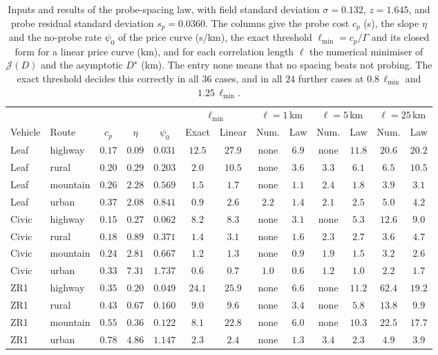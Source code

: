 \begin{table}[htbp]
\centering\small
\setlength{\tabcolsep}{3pt}
\caption{Inputs and results of the probe-spacing law, with field standard deviation $\sigma=0.132$, $z=1.645$, and probe residual standard deviation $s_p=0.0360$. The columns give the probe cost $c_p$ (s), the slope $\eta$ and the no-probe rate $\psi_0$ of the price curve (s/km), the exact threshold $\ell_{\min}=c_p/\Gamma$ and its closed form for a linear price curve (km), and for each correlation length $\ell$ the numerical minimiser of $\mathcal J(D)$ and the asymptotic $D^\star$ (km). The entry none means that no spacing beats not probing. The exact threshold decides this correctly in all $36$ cases, and in all $24$ further cases at $0.8\,\ell_{\min}$ and $1.25\,\ell_{\min}$.}\label{tab:app-spacing}
\begin{tabular}{llccccccccccc}
\toprule
& & & & & \multicolumn{2}{c}{$\ell_{\min}$} & \multicolumn{2}{c}{$\ell=1$\,km} & \multicolumn{2}{c}{$\ell=5$\,km} & \multicolumn{2}{c}{$\ell=25$\,km}\\
\cmidrule(lr){6-7}\cmidrule(lr){8-9}\cmidrule(lr){10-11}\cmidrule(lr){12-13}
Vehicle & Route & $c_p$ & $\eta$ & $\psi_0$ & Exact & Linear & Num. & Law & Num. & Law & Num. & Law\\
\midrule
Leaf & highway & $0.17$ & $0.09$ & $0.031$ & $12.5$ & $27.9$ & none & $6.9$ & none & $11.8$ & $20.6$ & $20.2$\\
Leaf & rural & $0.20$ & $0.29$ & $0.203$ & $2.0$ & $10.5$ & none & $3.6$ & $3.3$ & $6.1$ & $6.5$ & $10.5$\\
Leaf & mountain & $0.26$ & $2.28$ & $0.569$ & $1.5$ & $1.7$ & none & $1.1$ & $2.4$ & $1.8$ & $3.9$ & $3.1$\\
Leaf & urban & $0.37$ & $2.08$ & $0.841$ & $0.9$ & $2.6$ & $2.2$ & $1.4$ & $2.1$ & $2.5$ & $5.0$ & $4.2$\\
Civic & highway & $0.15$ & $0.27$ & $0.062$ & $8.2$ & $8.3$ & none & $3.1$ & none & $5.3$ & $12.6$ & $9.0$\\
Civic & rural & $0.18$ & $0.89$ & $0.371$ & $1.4$ & $3.1$ & none & $1.6$ & $2.3$ & $2.7$ & $3.6$ & $4.7$\\
Civic & mountain & $0.24$ & $2.81$ & $0.667$ & $1.2$ & $1.3$ & none & $0.9$ & $1.9$ & $1.5$ & $3.2$ & $2.6$\\
Civic & urban & $0.33$ & $7.31$ & $1.737$ & $0.6$ & $0.7$ & $1.0$ & $0.6$ & $1.2$ & $1.0$ & $2.2$ & $1.7$\\
ZR1 & highway & $0.35$ & $0.20$ & $0.049$ & $24.1$ & $25.9$ & none & $6.6$ & none & $11.2$ & $62.4$ & $19.2$\\
ZR1 & rural & $0.43$ & $0.67$ & $0.160$ & $9.0$ & $9.6$ & none & $3.4$ & none & $5.8$ & $13.8$ & $9.9$\\
ZR1 & mountain & $0.55$ & $0.36$ & $0.122$ & $8.1$ & $22.8$ & none & $6.0$ & none & $10.3$ & $22.5$ & $17.7$\\
ZR1 & urban & $0.78$ & $4.86$ & $1.147$ & $2.3$ & $2.4$ & none & $1.3$ & $3.4$ & $2.3$ & $4.9$ & $3.9$\\
\bottomrule
\end{tabular}
\end{table}

